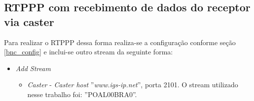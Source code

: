 \subsection{RTPPP com recebimento de dados do receptor via caster}
\label{rtppp_caster_bnc}
Para realizar o RTPPP dessa forma realiza-se a configuração conforme seção \ref{bnc_config} e inclui-se outro stream da seguinte forma:
\begin{itemize}
    \item \textit{Add Stream}
    \begin{itemize}
        \item \textit{Caster} - \textit{Caster host} ''\textit{www.igs-ip.net}'', porta 2101. O stream utilizado nesse trabalho foi: ''POAL00BRA0''.
    \end{itemize}
\end{itemize}



